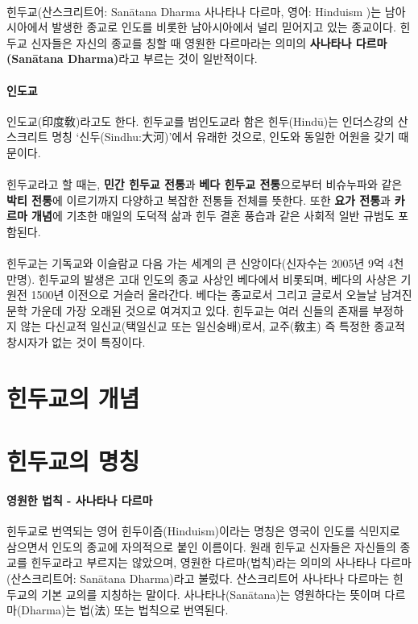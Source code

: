 \documentclass[12pt, a4paper, oneside]{book}
\let\stdsection\section
\renewcommand\section{\newpage\stdsection}
\begin{document}
\paragraph{}
힌두교(산스크리트어: Sanātana Dharma 사나타나 다르마, 영어: Hinduism )는 남아시아에서 발생한 종교로 인도를 비롯한 남아시아에서 널리 믿어지고 있는 종교이다. 
힌두교 신자들은 자신의 종교를 칭할 때 영원한 다르마라는 의미의 \textbf{사나타나 다르마(Sanātana Dharma)}라고 부르는 것이 일반적이다.

\paragraph{인도교}
인도교(印度敎)라고도 한다. 
힌두교를 범인도교라 함은 힌두(Hindū)는 인더스강의 산스크리트 명칭 ‘신두(Sindhu:大河)’에서 유래한 것으로, 인도와 동일한 어원을 갖기 때문이다. 

\paragraph{}
힌두교라고 할 때는, \textbf{민간 힌두교 전통}과 \textbf{베다 힌두교 전통}으로부터 비슈누파와 같은 \textbf{박티 전통}에 이르기까지 다양하고 복잡한 전통들 전체를 뜻한다. 
또한 \textbf{요가 전통}과 \textbf{카르마 개념}에 기초한 매일의 도덕적 삶과 힌두 결혼 풍습과 같은 사회적 일반 규범도 포함된다.

\paragraph{}
힌두교는 기독교와 이슬람교 다음 가는 세계의 큰 신앙이다(신자수는 2005년 9억 4천만명). 
힌두교의 발생은 고대 인도의 종교 사상인 베다에서 비롯되며, 베다의 사상은 기원전 1500년 이전으로 거슬러 올라간다. 
베다는 종교로서 그리고 글로서 오늘날 남겨진 문학 가운데 가장 오래된 것으로 여겨지고 있다. 
힌두교는 여러 신들의 존재를 부정하지 않는 다신교적 일신교(택일신교 또는 일신숭배)로서, 교주(敎主) 즉 특정한 종교적 창시자가 없는 것이 특징이다.


\section{힌두교의 개념}



\section{힌두교의 명칭}

\paragraph{영원한 법칙 - 사나타나 다르마}
힌두교로 번역되는 영어 힌두이즘(Hinduism)이라는 명칭은 영국이 인도를 식민지로 삼으면서 인도의 종교에 자의적으로 붙인 이름이다. 
원래 힌두교 신자들은 자신들의 종교를 힌두교라고 부르지는 않았으며, 영원한 다르마(법칙)라는 의미의 사나타나 다르마(산스크리트어: Sanātana Dharma)라고 불렀다. 
산스크리트어 사나타나 다르마는 힌두교의 기본 교의를 지칭하는 말이다. 
사나타나(Sanātana)는 영원하다는 뜻이며 다르마(Dharma)는 법(法) 또는 법칙으로 번역된다.
\end{document}
